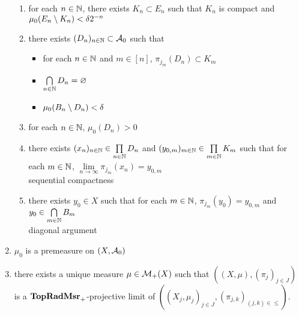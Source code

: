 \documentclass{book}
\begin{document}
\begin{ex}
\begin{enumerate}
		\begin{enumerate}
			\item for each $n \in \mathbb{N}$, there exists $K_n \subset E_n$ such that $K_n$ is compact and $\mu_0(E_n \setminus K_n) < \delta2^{-n}$
			\item there exists $(D_n)_{n \in \mathbb{N}} \subset \mathcal{A}_0$ such that 
			\begin{itemize}
				\item for each $n \in \mathbb{N}$ and $m \in [n]$, $\pi_{j_m}(D_n) \subset K_m$ 
				\item $\bigcap\limits_{n \in \mathbb{N}} D_n = \varnothing$
				\item $\mu_0(B_n \setminus D_n) < \delta$
			\end{itemize}
			\item for each $n \in \mathbb{N}$, $\mu_0(D_n) > 0$ 
			\item there exists $(x_n)_{n \in \mathbb{N}} \in \prod\limits_{n \in \mathbb{N}} D_n$ and $(y_{0, m})_{m \in \mathbb{N}} \in \prod\limits_{m \in \mathbb{N}} K_m$ such that for each $m \in \mathbb{N}$, $\lim\limits_{n \rightarrow \infty} \pi_{j_m}(x_n) = y_{0,m}$ \\
			 sequential compactness
			\item there exists $y_0 \in X$ such that for each $m \in \mathbb{N}$, $\pi_{j_m}(y_0) = y_{0,m}$ and $y_0 \in \bigcap\limits_{m \in \mathbb{N}} B_m$\\
			 diagonal argument 
		\end{enumerate}
		\item $\mu_0$ is a premeasure on $(X, \mathcal{A}_0)$\\
		  
		\item there exists a unique measure $\mu \in \mathcal{M}_+(X)$ such that $((X, \mu), (\pi_j)_{j \in J})$ is a $\operatorname*{\text{\textbf{TopRadMsr}}_{+}}$-projective limit of $((X_j, \mu_j)_{j \in J}, (\pi_{j,k})_{(j,k) \in {\leq}})$. 
	\end{enumerate}
\end{ex}
\end{document}

